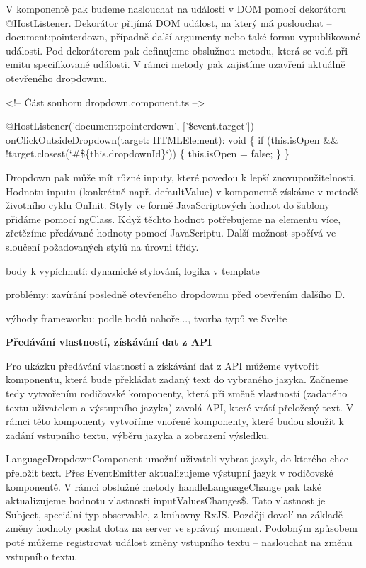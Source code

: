 V komponentě pak budeme naslouchat na události v DOM pomocí dekorátoru @HostListener. 
Dekorátor přijímá DOM událost, na který má poslouchat -- document:pointerdown, případně další argumenty nebo také formu vypublikované události. 
Pod dekorátorem pak definujeme obslužnou metodu, která se volá při emitu specifikované události. V rámci metody pak zajistíme uzavření aktuálně otevřeného dropdownu.

\begin{prog}
<!-- Část souboru dropdown.component.ts -->

@HostListener('document:pointerdown', ['\$event.target'])
onClickOutsideDropdown(target: HTMLElement): void \{
  if (this.isOpen && !target.closest(`#\$\{this.dropdownId\}`)) \{
    this.isOpen = false;
  \}
\}
\end{prog}

Dropdown pak může mít různé inputy, které povedou k lepší znovupoužitelnosti. Hodnotu inputu (konkrétně např. defaultValue) v komponentě získáme v metodě životního cyklu OnInit. 
Styly ve formě JavaScriptových hodnot do šablony přidáme pomocí ngClass. Když těchto hodnot potřebujeme na elementu více, zřetězíme předávané hodnoty pomocí JavaScriptu. 
Další možnost spočívá ve sloučení požadovaných stylů na úrovni třídy.

\begin{citemize}
	\item body k vypíchnutí: dynamické stylování, logika v template
	\item problémy: zavírání posledně otevřeného dropdownu před otevřením dalšího D.
	\item výhody frameworku: podle bodů nahoře..., tvorba typů ve Svelte
\end{citemize}

\begin{flushleft}
  \textbf{Předávání vlastností, získávání dat z API}
\end{flushleft}

Pro ukázku předávání vlastností a získávání dat z API můžeme vytvořit komponentu, která bude překládat zadaný text do vybraného jazyka. 
Začneme tedy vytvořením rodičovské komponenty, která při změně vlastností (zadaného textu uživatelem a výstupního jazyka) zavolá API, které vrátí přeložený text. 
V rámci této komponenty vytvoříme vnořené komponenty, které budou sloužit k zadání vstupního textu, výběru jazyka a zobrazení výsledku. 

LanguageDropdownComponent umožní uživateli vybrat jazyk, do kterého chce přeložit text. 
Přes EventEmitter aktualizujeme výstupní jazyk v rodičovské komponentě. V rámci obslužné metody handleLanguageChange pak také aktualizujeme hodnotu vlastnosti inputValuesChanges\$.
Tato vlastnost je Subject, speciální typ observable, z knihovny RxJS. Později dovolí na základě změny hodnoty poslat dotaz na server ve správný moment. 
Podobným způsobem poté můžeme registrovat událost změny vstupního textu -- naslouchat na změnu vstupního textu.

